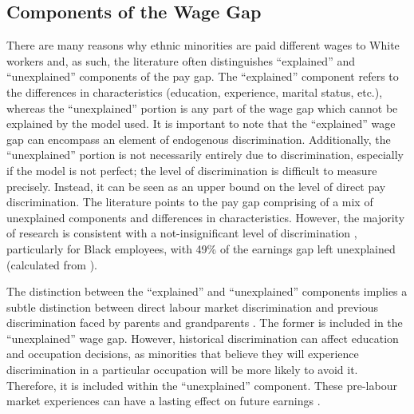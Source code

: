\documentclass[class=article, crop=false]{standalone}
\begin{document}
\subsection{Components of the Wage Gap}
\label{sec:components}
There are many reasons why ethnic minorities are paid different wages to White workers and, as such, the literature often distinguishes \enquote{explained} and \enquote{unexplained} components of the pay gap. The \enquote{explained} component refers to the differences in characteristics (education, experience, marital status, etc.), whereas the \enquote{unexplained} portion is any part of the wage gap which cannot be explained by the model used. It is important to note that the \enquote{explained} wage gap can encompass an element of endogenous discrimination. Additionally, the \enquote{unexplained} portion is not necessarily entirely due to discrimination, especially if the model is not perfect; the level of discrimination is difficult to measure precisely. Instead, it can be seen as an upper bound on the level of direct pay discrimination. The literature points to the pay gap comprising of a mix of unexplained components and differences in characteristics. However, the majority of research is consistent with a not-insignificant level of discrimination \citep{Metcalf}, particularly for Black employees, with 49\% of the earnings gap left unexplained (calculated from \citet[p.~374]{Blackaby}).

The distinction between the \enquote{explained} and \enquote{unexplained} components implies a subtle distinction between direct labour market discrimination and previous discrimination faced by parents and grandparents \citep{Lundberg}. The former is included in the \enquote{unexplained} wage gap. However, historical discrimination can affect education and occupation decisions, as minorities that believe they will experience discrimination in a particular occupation will be more likely to avoid it. Therefore, it is included within the \enquote{unexplained} component. These pre-labour market experiences can have a lasting effect on future earnings \citep{Altonji, Hedman, Berthoud}.
\end{document}
